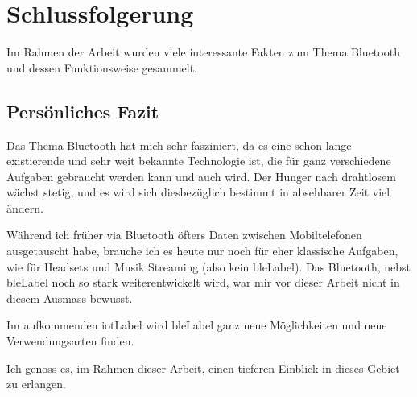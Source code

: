 \chapter{Schlussfolgerung}

Im Rahmen der Arbeit wurden viele interessante Fakten zum Thema Bluetooth und dessen Funktionsweise gesammelt.


\section{Persönliches Fazit}
Das Thema Bluetooth hat mich sehr fasziniert, da es eine schon lange existierende und sehr weit bekannte Technologie ist, die für ganz verschiedene Aufgaben gebraucht werden kann und auch wird.
Der Hunger nach drahtlosem wächst stetig, und es wird sich diesbezüglich bestimmt in absehbarer Zeit viel ändern.

Während ich früher via Bluetooth öfters Daten zwischen Mobiltelefonen ausgetauscht habe, brauche ich es heute nur noch für eher klassische Aufgaben, wie für Headsets und Musik Streaming (also kein \gls{bleLabel}).
Das Bluetooth, nebst \gls{bleLabel} noch so stark weiterentwickelt wird, war mir vor dieser Arbeit nicht in diesem Ausmass bewusst.

Im aufkommenden \gls{iotLabel} wird \gls{bleLabel} ganz neue Möglichkeiten und neue Verwendungsarten finden.

Ich genoss es, im Rahmen dieser Arbeit, einen tieferen Einblick in dieses Gebiet zu erlangen.
